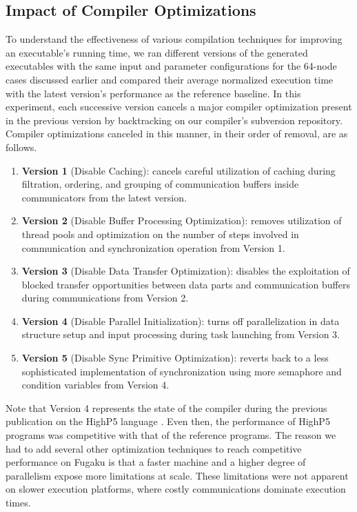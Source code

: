 \documentclass[ASNA,twocolumn]{USG} %
\begin{document}
{\subsection{Impact of Compiler Optimizations}
\label{subsec:expr-comp-opt}
{\color{red}
To understand the effectiveness of various compilation techniques for improving an executable's running time, we ran different versions of the generated executables with the same input and parameter configurations for the 64-node cases discussed earlier and compared their average normalized execution time with the latest version's performance as the reference baseline. In this experiment, each successive version cancels a major compiler optimization present in the previous version by backtracking on our compiler's subversion repository. Compiler optimizations canceled in this manner, in their order of removal, are as follows.

\begin{enumerate}
    \item \textbf{Version 1} (Disable Caching): cancels careful utilization of caching during filtration, ordering, and grouping of communication buffers inside communicators from the latest version.
    \item \textbf{Version 2} (Disable Buffer Processing Optimization): removes utilization of thread pools and optimization on the number of steps involved in communication and synchronization operation from Version 1.
    \item \textbf{Version 3} (Disable Data Transfer Optimization): disables the exploitation of blocked transfer opportunities between data parts and communication buffers during communications from Version 2.
    \item \textbf{Version 4} (Disable Parallel Initialization): turns off parallelization in data structure setup and input processing during task launching from Version 3.
    \item \textbf{Version 5} (Disable Sync Primitive Optimization): reverts back to a less sophisticated implementation of synchronization using more semaphore and condition variables from Version 4.
\end{enumerate}
Note that Version 4 represents the state of the compiler during the previous publication on the HighP5 language \citep{yanhaona2024highp5}. Even then, the performance of HighP5 programs was competitive with that of the reference programs. The reason we had to add several other optimization techniques to reach competitive performance on Fugaku is that a faster machine and a higher degree of parallelism expose more limitations at scale. These limitations were not apparent on slower execution platforms, where costly communications dominate execution times. 

}}
\end{document}
